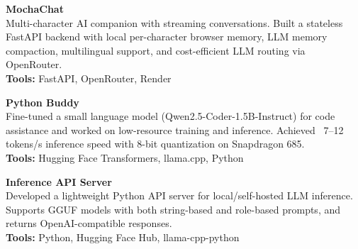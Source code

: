 
\begin{cvlistsection}

\item \textbf{MochaChat} \href{https://github.com/2ufiq/mocha-chat}{\faGithub}  \href{https://mocha-chat.onrender.com/}{\textcolor{Cerulean}{\faExternalLink*}}\\
Multi-character AI companion with streaming conversations. Built a stateless FastAPI backend with local per-character browser memory, LLM memory compaction, multilingual support, and cost-efficient LLM routing via OpenRouter.\\
\textbf{Tools:} FastAPI, OpenRouter, Render

\item \textbf{Python Buddy} \href{https://github.com/2ufiq/slm-python-buddy}{\faGithub}\\
Fine-tuned a small language model (Qwen2.5-Coder-1.5B-Instruct) for code assistance and worked on low-resource training and inference. Achieved ~7–12 tokens/s inference speed with 8-bit quantization on Snapdragon 685.\\
\textbf{Tools:} Hugging Face Transformers, llama.cpp, Python

\item \textbf{Inference API Server} \href{https://github.com/2ufiq/slm-api-server}{\faGithub}\\
Developed a lightweight Python API server for local/self-hosted LLM inference. Supports GGUF models with both string-based and role-based prompts, and returns OpenAI-compatible responses.\\
\textbf{Tools:} Python, Hugging Face Hub, llama-cpp-python




\end{cvlistsection}
